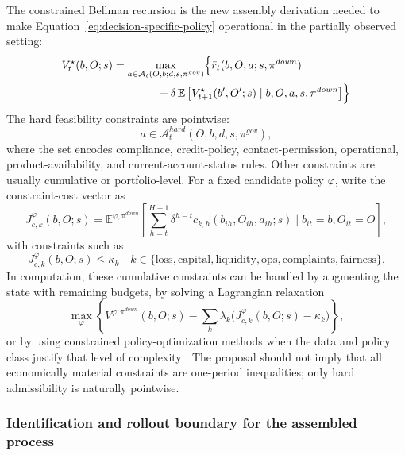 \documentclass[11pt]{article}
\newcommand{\E}{\mathbb{E}}
\newcommand{\1}{\mathbf{1}}
\begin{document}
The constrained Bellman recursion is the new assembly derivation needed to make
Equation~\eqref{eq:decision-specific-policy} operational in the partially
observed setting:
\begin{align}
  V_t^{\star}(b,O;s)
  &=
  \max_{a\in\mathcal{A}_{t}(O,b;d,s,\pi^{gov})}
  \Bigl\{
    \bar r_t(b,O,a;s,\pi^{down})
    \nonumber\\
    &\qquad\qquad
    + \delta\,\E\left[V_{t+1}^{\star}(b',O';s)\mid b,O,a,s,\pi^{down}\right]
  \Bigr\}
  \label{eq:ss-bellman}
\end{align}
The hard feasibility constraints are pointwise:
\begin{equation}
  a\in \mathcal{A}^{hard}_{t}(O,b,d,s,\pi^{gov}),
  \label{eq:ss-hard-feasible}
\end{equation}
where the set encodes compliance, credit-policy, contact-permission, operational,
product-availability, and current-account-status rules. Other constraints are
usually cumulative or portfolio-level. For a fixed candidate policy $\varphi$,
write the constraint-cost vector as
\begin{equation}
  J^{\varphi}_{c,k}(b,O;s)
  =
  \E^{\varphi,\pi^{down}}\!\left[
    \sum_{h=t}^{H-1}\delta^{h-t}
    c_{k,h}(b_{ih},O_{ih},a_{ih};s)
    \mid b_{it}=b,O_{it}=O
  \right],
  \label{eq:ss-cumulative-constraint}
\end{equation}
with constraints such as
\begin{equation}
  J^{\varphi}_{c,k}(b,O;s)\le \kappa_k
  \quad
  k\in\{\mathrm{loss},\mathrm{capital},\mathrm{liquidity},
  \mathrm{ops},\mathrm{complaints},\mathrm{fairness}\}.
  \label{eq:ss-cmdp-constraints}
\end{equation}
In computation, these cumulative constraints can be handled by augmenting the
state with remaining budgets, by solving a Lagrangian relaxation
\begin{equation}
  \max_{\varphi}
  \left\{
    V^{\varphi;\pi^{down}}(b,O;s)
    -
    \sum_k \lambda_k\bigl(J^{\varphi}_{c,k}(b,O;s)-\kappa_k\bigr)
  \right\},
  \label{eq:ss-lagrangian-cmdp}
\end{equation}
or by using constrained policy-optimization methods when the data and policy
class justify that level of complexity \citep{achiam2017cpo}. The proposal should
not imply that all economically material constraints are one-period inequalities;
only hard admissibility is naturally pointwise.

\subsubsection{Identification and rollout boundary for the assembled process}
\label{subsec:state-space-identification-boundary}
\end{document}
